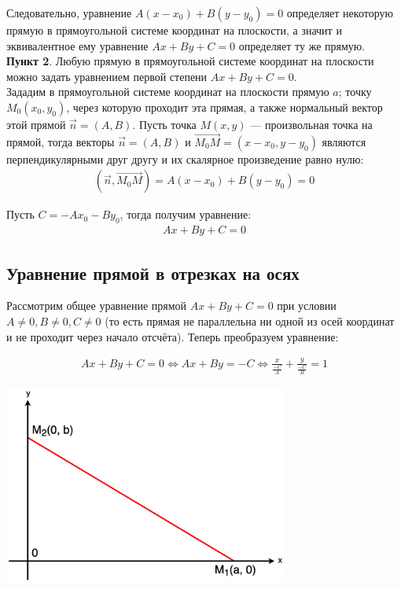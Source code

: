 \documentclass[a4paper,12pt]{extbook}
\theoremstyle{named}
\theoremstyle{named}
\begin{document}
Следовательно, уравнение \(A(x - x_0) + B(y - y_0) = 0\) определяет некоторую прямую в прямоугольной системе координат на плоскости, а значит и эквивалентное ему уравнение \(Ax + By + C = 0\) определяет ту же прямую. \\

\textbf{Пункт 2}. Любую прямую в прямоугольной системе координат на плоскости можно задать уравнением первой степени \(Ax + By + C = 0\). \\

Зададим в прямоугольной системе координат на плоскости прямую \(a \); точку \(M_0(x_0, y_0)\), через которую проходит эта прямая, а также нормальный вектор этой прямой \(\overrightarrow{n} = (A, B)\).
Пусть точка \(M(x, y)\) — произвольная точка на прямой, тогда векторы \(\overrightarrow{n} = (A, B)\) и \(\overrightarrow{M_0M} = (x - x_0, y - y_0)\) являются перпендикулярными друг другу и их скалярное произведение равно нулю:
\begin{gather*}
    (\overrightarrow{n}, \overrightarrow{M_0M}) = A(x - x_0) + B(y - y_0) = 0
\end{gather*}

Пусть \(C = -Ax_0 - By_0\), тогда получим уравнение:
\begin{gather*}
    Ax + By + C = 0
\end{gather*}

\subsection*{Уравнение прямой в отрезках на осях}

Рассмотрим общее уравнение прямой \(Ax + By + C = 0\) при условии \(A \neq 0, B \neq 0, C \neq 0\) (то есть прямая не параллельна ни одной из осей координат и не проходит через начало отсчёта).
Теперь преобразуем уравнение:

\begin{gather*}
    Ax + By + C = 0  \iff Ax + By = -C \iff \frac{x}{\frac{-C}{A}} + \frac{y}{\frac{-C}{B}} = 1
\end{gather*}

\begin{center}
    \includegraphics[width=0.7\textwidth]{axis_line.png}
\end{center}
\end{document}
